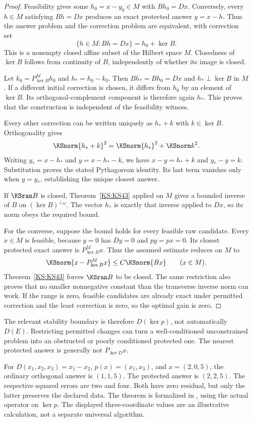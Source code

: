 \begin{proof}
Feasibility gives some $h_0=x-y_0\in M$ with $Bh_0=Dx$. Conversely, every $h\in M$ satisfying $Bh=Dx$ produces an exact protected answer $y=x-h$. Thus the answer problem and the correction problem are equivalent, with correction set
\[
 \{h\in M:Bh=Dx\}=h_0+\ker B.
\]
This is a nonempty closed affine subset of the Hilbert space $M$. Closedness of $\ker B$ follows from continuity of $B$, independently of whether its image is closed.

Let $k_0=P^M_{\ker B}h_0$ and $h_*=h_0-k_0$. Then $Bh_*=Bh_0=Dx$ and $h_*\perp\ker B$ in $M$. If a different initial correction is chosen, it differs from $h_0$ by an element of $\ker B$. Its orthogonal-complement component is therefore again $h_*$. This proves that the construction is independent of the feasibility witness.

Every other correction can be written uniquely as $h_*+k$ with $k\in\ker B$. Orthogonality gives
\[
 \KSnorm{h_*+k}^2=\KSnorm{h_*}^2+\KSnorm k^2.
\]
Writing $y_*=x-h_*$ and $y=x-h_*-k$, we have $x-y=h_*+k$ and $y_*-y=k$. Substitution proves the stated Pythagorean identity. Its last term vanishes only when $y=y_*$, establishing the unique closest answer.

If $\KSran B$ is closed, Theorem~\ref{KS:KS43} applied on $M$ gives a bounded inverse of $B$ on $(\ker B)^{\perp_M}$. The vector $h_*$ is exactly that inverse applied to $Dx$, so its norm obeys the required bound.

For the converse, suppose the bound holds for every feasible raw candidate. Every $x\in M$ is feasible, because $y=0$ has $Dy=0$ and $py=px=0$. Its closest protected exact answer is $P^M_{\ker B}x$. Thus the assumed estimate reduces on $M$ to
\[
 \KSnorm{x-P^M_{\ker B}x}\le C\KSnorm{Bx}\qquad(x\in M).
\]
Theorem~\ref{KS:KS43} forces $\KSran B$ to be closed. The same restriction also proves that no smaller nonnegative constant than the transverse inverse norm can work. If the range is zero, feasible candidates are already exact under permitted correction and the least correction is zero, so the optimal gain is zero.
\end{proof}
The relevant stability boundary is therefore \(D(\ker p)\), not automatically \(D(E)\). Restricting permitted changes can turn a well-conditioned unconstrained problem into an obstructed or poorly conditioned protected one. The nearest protected answer is generally not \(P_{\ker D}x\).

For \(D(x_1,x_2,x_3)=x_1-x_2\), \(p(x)=(x_1,x_3)\), and \(x=(2,0,5)\), the ordinary orthogonal answer is \((1,1,5)\). The protected answer is \((2,2,5)\). The respective squared errors are two and four. Both have zero residual, but only the latter preserves the declared data. The theorem is formalized in , using the actual operator on \(\ker p\). The displayed three-coordinate values are an illustrative calculation, not a separate universal algorithm.

